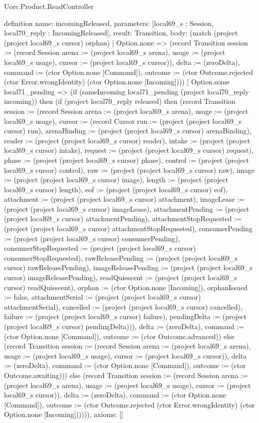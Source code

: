 \begin{lexlean}{Uorc.Product.ReadController}
\begin{semanticmodule}
definition{
  name: incomingReleased,
  parameters: [local69_s : Session, local70_reply : IncomingReleased],
  result: Transition,
  body: (match (project (project local69_s cursor) orphan)
    | Option.none => (record Transition {session := (record Session {arena := (project local69_s arena), usage := (project local69_s usage), cursor := (project local69_s cursor)}), delta := (zeroDelta), command := (ctor Option.none [Command]), outcome := (ctor Outcome.rejected (ctor Error.wrongIdentity) (ctor Option.none [Incoming]))})
    | Option.some local71_pending => (if (sameIncoming local71_pending (project local70_reply incoming)) then (if (project local70_reply released) then (record Transition {session := (record Session {arena := (project local69_s arena), usage := (project local69_s usage), cursor := (record Cursor {run := (project (project local69_s cursor) run), arenaBinding := (project (project local69_s cursor) arenaBinding), reader := (project (project local69_s cursor) reader), intake := (project (project local69_s cursor) intake), request := (project (project local69_s cursor) request), phase := (project (project local69_s cursor) phase), control := (project (project local69_s cursor) control), raw := (project (project local69_s cursor) raw), image := (project (project local69_s cursor) image), length := (project (project local69_s cursor) length), eof := (project (project local69_s cursor) eof), attachment := (project (project local69_s cursor) attachment), imageLease := (project (project local69_s cursor) imageLease), attachmentPending := (project (project local69_s cursor) attachmentPending), attachmentStopRequested := (project (project local69_s cursor) attachmentStopRequested), consumerPending := (project (project local69_s cursor) consumerPending), consumerStopRequested := (project (project local69_s cursor) consumerStopRequested), rawReleasePending := (project (project local69_s cursor) rawReleasePending), imageReleasePending := (project (project local69_s cursor) imageReleasePending), readQuiescent := (project (project local69_s cursor) readQuiescent), orphan := (ctor Option.none [Incoming]), orphanIssued := false, attachmentSerial := (project (project local69_s cursor) attachmentSerial), cancelled := (project (project local69_s cursor) cancelled), failure := (project (project local69_s cursor) failure), pendingDelta := (project (project local69_s cursor) pendingDelta)})}), delta := (zeroDelta), command := (ctor Option.none [Command]), outcome := (ctor Outcome.advanced)}) else (record Transition {session := (record Session {arena := (project local69_s arena), usage := (project local69_s usage), cursor := (project local69_s cursor)}), delta := (zeroDelta), command := (ctor Option.none [Command]), outcome := (ctor Outcome.awaiting)})) else (record Transition {session := (record Session {arena := (project local69_s arena), usage := (project local69_s usage), cursor := (project local69_s cursor)}), delta := (zeroDelta), command := (ctor Option.none [Command]), outcome := (ctor Outcome.rejected (ctor Error.wrongIdentity) (ctor Option.none [Incoming]))}))),
  axioms: []
}


\end{semanticmodule}
\end{lexlean}
